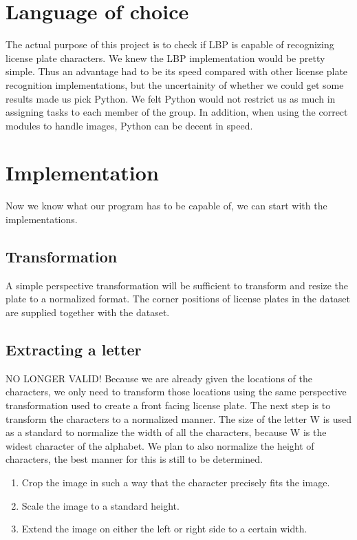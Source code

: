 \documentclass[a4paper]{article}
\begin{document}
\section{Language of choice}

The actual purpose of this project is to check if LBP is capable of recognizing
license plate characters. We knew the LBP implementation would be pretty
simple. Thus an advantage had to be its speed compared with other license plate 
recognition implementations, but the uncertainity of whether we could get some
results made us pick Python. We felt Python would not restrict us as much in 
assigning tasks to each member of the group. In addition, when using the
correct modules to handle images, Python can be decent in speed.

\section{Implementation}

Now we know what our program has to be capable of, we can start with the
implementations.


\subsection{Transformation}

A simple perspective transformation will be sufficient to transform and resize
the plate to a normalized format. The corner positions of license plates in the
dataset are supplied together with the dataset.

\subsection{Extracting a letter}

NO LONGER VALID!
Because we are already given the locations of the characters, we only need to
transform those locations using the same perspective transformation used to
create a front facing license plate. The next step is to transform the
characters to a normalized manner. The size of the letter W is used as a
standard to normalize the width of all the characters, because W is the widest
character of the alphabet. We plan to also normalize the height of characters,
the best manner for this is still to be determined.

\begin{enumerate}
    \item Crop the image in such a way that the character precisely fits the
          image.
    \item Scale the image to a standard height.
    \item Extend the image on either the left or right side to a certain width.
\end{enumerate}
\end{document}
